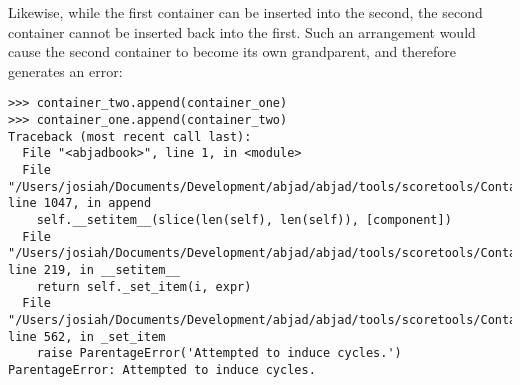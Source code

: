\noindent Likewise, while the first container can be inserted into the second,
the second container cannot be inserted back into the first. Such an
arrangement would cause the second container to become its own grandparent, and
therefore generates an error:

\begin{comment}
<abjad>[allow_exceptions]
container_two.append(container_one)
container_one.append(container_two)
</abjad>
\end{comment}

\begin{abjadbookoutput}
\begin{singlespacing}
\vspace{-0.5\baselineskip}
\begin{lstlisting}
>>> container_two.append(container_one)
>>> container_one.append(container_two)
Traceback (most recent call last):
  File "<abjadbook>", line 1, in <module>
  File "/Users/josiah/Documents/Development/abjad/abjad/tools/scoretools/Container.py", line 1047, in append
    self.__setitem__(slice(len(self), len(self)), [component])
  File "/Users/josiah/Documents/Development/abjad/abjad/tools/scoretools/Container.py", line 219, in __setitem__
    return self._set_item(i, expr)
  File "/Users/josiah/Documents/Development/abjad/abjad/tools/scoretools/Container.py", line 562, in _set_item
    raise ParentageError('Attempted to induce cycles.')
ParentageError: Attempted to induce cycles.
\end{lstlisting}
\end{singlespacing}
\end{abjadbookoutput}

